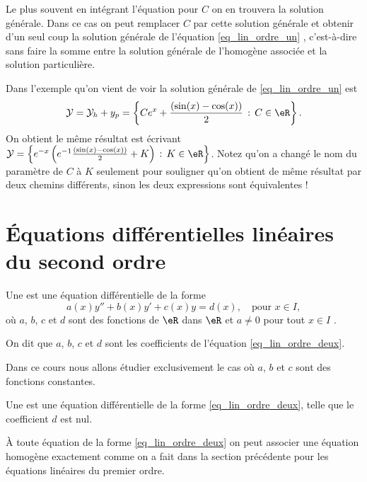 \begin{remark}
  Le plus souvent en intégrant l'équation pour $C$ on en trouvera la solution générale. Dans ce cas on peut remplacer $C$ par cette solution générale et obtenir d'un seul coup la solution générale de l'équation \eqref{eq_lin_ordre_un} , c'est-à-dire sans faire la somme entre la solution générale de l'homogène associée et la solution particulière.

  \begin{example}
    Dans l'exemple qu'on vient de voir la solution générale de \eqref{eq_lin_ordre_un} est
    \begin{equation}
      \mathcal{Y} = \mathcal{Y}_h + y_p = \left\{Ce^x + \frac{(\sin(x)-\cos(x))}{2} \,:\, C\in\eR\right\}.
    \end{equation}
On obtient le m\^eme résultat est écrivant $\mathcal{Y} = \left\{e^{-x}\left(e^{-1}\frac{(\sin(x)-\cos(x))}{2} +K \right) \,:\, K\in\eR\right\}$. Notez qu'on a changé le nom du paramètre de $C$ à $K$ seulement pour souligner qu'on obtient de m\^eme résultat par deux chemins différents, sinon les deux expressions sont équivalentes !
  \end{example}
\end{remark}

\section{Équations différentielles linéaires du second ordre}
\label{Secordredeux}

\begin{definition}
Une   est une équation différentielle de la forme
\begin{equation}\label{eq_lin_ordre_deux}
  a(x)y'' + b(x) y' + c(x)y = d(x), \quad\text{pour } x\in I,
\end{equation}
o\`u $a$, $b$, $c$ et $d$ sont des fonctions de $\eR$ dans $\eR$ et $a\neq 0$ pour tout $x\in I$ .

On dit que $a$, $b$, $c$ et $d$ sont les coefficients de l'équation \eqref{eq_lin_ordre_deux}.
\end{definition}
Dans ce cours nous allons étudier exclusivement le cas où $a$, $b$ et $c$ sont des fonctions constantes.
\begin{definition}
Une   est une équation différentielle de la forme \eqref{eq_lin_ordre_deux}, telle que le coefficient $d$ est nul.
\end{definition}
À toute équation de la forme \eqref{eq_lin_ordre_deux} on peut associer une équation homogène exactement comme on a fait dans la section précédente pour les équations linéaires du premier ordre.

